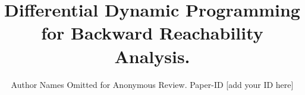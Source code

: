 \documentclass[conference]{IEEEtran}
\begin{document}
\title{Differential Dynamic Programming for Backward Reachability  Analysis.}

\author{Author Names Omitted for Anonymous Review. Paper-ID [add your ID here]}





% 


\maketitle
\end{document}
